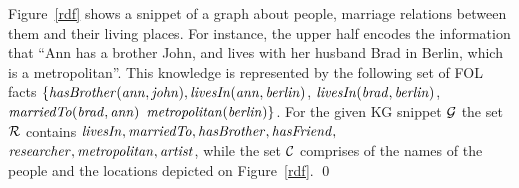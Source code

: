 \begin{example} Figure~\ref{rdf} shows a snippet of a graph about people, marriage %
relations between them %
and  their %
living places. For instance, the upper half encodes the information that ``Ann has a brother John, and lives with her husband Brad in Berlin, which is a metropolitan''. 
This knowledge is %
represented by the following set of FOL facts $\mathit{\{hasBrother(ann, john), livesIn(ann, berlin)}$, $\mathit{livesIn(brad, berlin)}$, $\mathit{marriedTo(brad, ann)}$
$\mathit{metropolitan(berlin)}\}$. For the given KG snippet $\mathcal{G}$ the set $\mathcal{R}$ contains $\mathit{livesIn,marriedTo,hasBrother,hasFriend,}$\\$\mathit{researcher,metropolitan,artist}$, while the set $\mathcal{C}$ comprises of the names of the people and the locations depicted on Figure~\ref{rdf}. \qed
\end{example}









